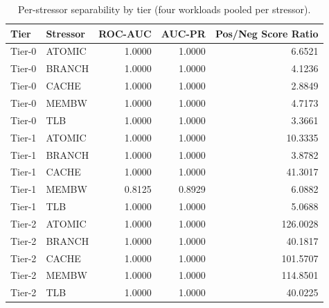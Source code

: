 \begin{table}[t]
\centering
\caption{Per-stressor separability by tier (four workloads pooled per stressor).}
\label{tab:dice_stressor_metrics}
\footnotesize
\begin{tabular}{llrrr}
\toprule
Tier & Stressor & ROC-AUC & AUC-PR & Pos/Neg Score Ratio \\
\midrule
Tier-0 & ATOMIC & 1.0000 & 1.0000 & 6.6521 \\
Tier-0 & BRANCH & 1.0000 & 1.0000 & 4.1236 \\
Tier-0 & CACHE & 1.0000 & 1.0000 & 2.8849 \\
Tier-0 & MEMBW & 1.0000 & 1.0000 & 4.7173 \\
Tier-0 & TLB & 1.0000 & 1.0000 & 3.3661 \\
Tier-1 & ATOMIC & 1.0000 & 1.0000 & 10.3335 \\
Tier-1 & BRANCH & 1.0000 & 1.0000 & 3.8782 \\
Tier-1 & CACHE & 1.0000 & 1.0000 & 41.3017 \\
Tier-1 & MEMBW & 0.8125 & 0.8929 & 6.0882 \\
Tier-1 & TLB & 1.0000 & 1.0000 & 5.0688 \\
Tier-2 & ATOMIC & 1.0000 & 1.0000 & 126.0028 \\
Tier-2 & BRANCH & 1.0000 & 1.0000 & 40.1817 \\
Tier-2 & CACHE & 1.0000 & 1.0000 & 101.5707 \\
Tier-2 & MEMBW & 1.0000 & 1.0000 & 114.8501 \\
Tier-2 & TLB & 1.0000 & 1.0000 & 40.0225 \\
\bottomrule
\end{tabular}

\end{table}
